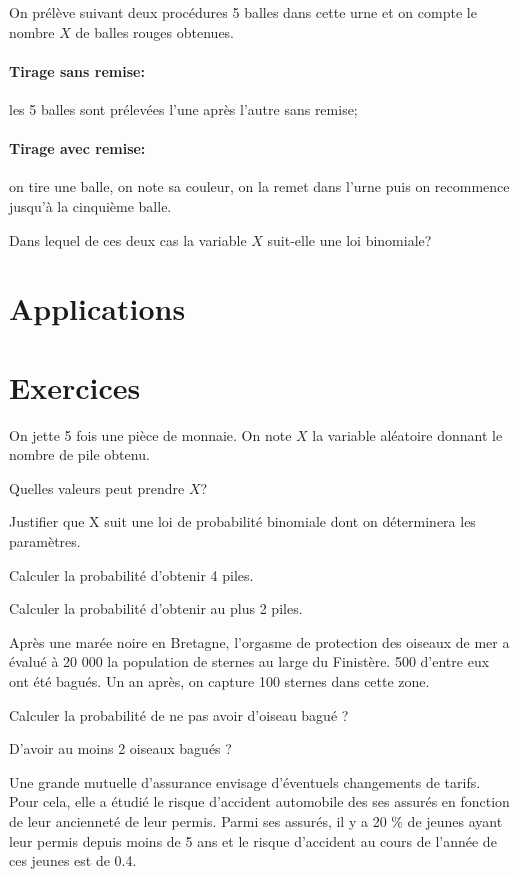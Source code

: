 \documentclass[a4paper,12pt]{scrartcl}
\begin{document}
On prélève suivant deux procédures 5 balles dans cette urne et on compte le nombre $X$ de balles rouges obtenues.

\paragraph{Tirage sans remise:} les 5 balles sont prélevées l'une après l'autre sans remise;

\paragraph{Tirage avec remise:} on tire une balle, on note sa couleur, on la remet dans l'urne puis on recommence jusqu'à la cinquième balle. 

Dans lequel de ces deux cas la variable $X$ suit-elle une loi binomiale?


\section{Applications}

\section*{Exercices}


On jette 5 fois une pièce de monnaie. On note $X$ la variable aléatoire donnant le nombre de pile obtenu.

\question{}Quelles valeurs peut prendre $X$?

\question{}Justifier que X suit une loi de probabilité binomiale dont on déterminera les paramètres. 

\question{}Calculer la probabilité d'obtenir 4 piles. 

\question{}Calculer la probabilité d'obtenir au plus 2 piles.


Après une marée noire en Bretagne, l'orgasme de protection des oiseaux de mer a évalué à 20 000 la population de sternes au large du Finistère. 500 d'entre eux ont été bagués. Un an après, on capture 100 sternes dans cette zone.

\question{}Calculer la probabilité de ne pas avoir d'oiseau bagué ?

\question{}D'avoir au moins 2 oiseaux bagués ?


Une grande mutuelle d'assurance envisage d'éventuels changements de tarifs. Pour cela, elle a étudié le risque d'accident automobile des ses assurés en fonction de leur ancienneté de leur permis. Parmi ses assurés, il y a 20 \% de jeunes ayant leur permis depuis moins de 5 ans et le risque d'accident au cours de l'année de ces jeunes est de 0.4.
\end{document}
